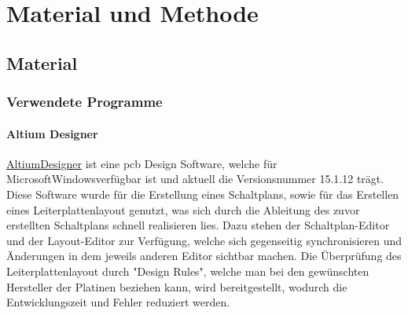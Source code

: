 \chapter{Material und Methode}
\section{Material}
\subsection{Verwendete Programme}
\subsubsection*{Altium Designer}
\href{http://www.altium.com/de/altium-designer/overview}{Altium\SymbReg Designer\SymbReg} ist eine \ac{pcb} Design Software, welche für Microsoft\SymbC Windows\SymbReg verfügbar ist und aktuell die Versionsnummer 15.1.12 trägt. Diese Software wurde für die Erstellung eines Schaltplans, sowie für das Erstellen eines Leiterplattenlayout genutzt, was sich durch die Ableitung des zuvor erstellten Schaltplans schnell realisieren lies. Dazu stehen der Schaltplan-Editor und der Layout-Editor zur Verfügung, welche sich gegenseitig synchronisieren und Änderungen in dem jeweils anderen Editor sichtbar machen. Die Überprüfung des Leiterplattenlayout durch "Design Rules", welche man bei den gewünschten Hersteller der Platinen beziehen kann, wird bereitgestellt, wodurch die Entwicklungszeit und Fehler reduziert werden. \cite{altium}

